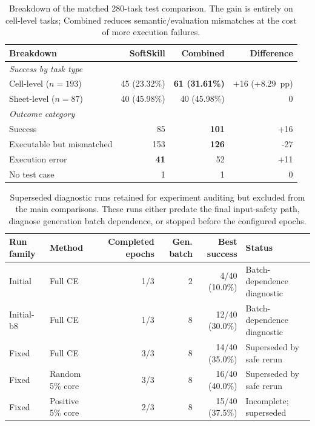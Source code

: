 \documentclass[10pt]{article}
\newcommand{\best}[1]{\textbf{#1}}
\newcommand{\pp}{~pp}
\begin{document}
\begin{table}[t]
  \centering
  \caption{Breakdown of the matched 280-task test comparison. The gain is entirely
  on cell-level tasks; Combined reduces semantic/evaluation mismatches at the cost
  of more execution failures.}
  \label{tab:test-breakdown}
  \small
  \begin{tabular}{lrrr}
    \toprule
    Breakdown & SoftSkill & Combined & Difference \\
    \midrule
    \multicolumn{4}{l}{\emph{Success by task type}} \\
    Cell-level ($n=193$) & 45 (23.32\%) & \best{61 (31.61\%)} & +16 (+8.29\pp) \\
    Sheet-level ($n=87$) & 40 (45.98\%) & 40 (45.98\%) & 0 \\
    \midrule
    \multicolumn{4}{l}{\emph{Outcome category}} \\
    Success & 85 & \best{101} & +16 \\
    Executable but mismatched & 153 & \best{126} & -27 \\
    Execution error & \best{41} & 52 & +11 \\
    No test case & 1 & 1 & 0 \\
    \bottomrule
  \end{tabular}
\end{table}

\clearpage
\begin{table}[t]
  \centering
  \caption{Superseded diagnostic runs retained for experiment auditing but excluded
  from the main comparisons. These runs either predate the final input-safety path,
  diagnose generation batch dependence, or stopped before the configured epochs.}
  \label{tab:superseded-runs}
  \small
  \begin{tabular}{llrrrl}
    \toprule
    Run family & Method & Completed epochs & Gen. batch & Best success & Status \\
    \midrule
    Initial & Full CE & 1/3 & 2 & 4/40 (10.0\%) & Batch-dependence diagnostic \\
    Initial-b8 & Full CE & 1/3 & 8 & 12/40 (30.0\%) & Batch-dependence diagnostic \\
    Fixed & Full CE & 3/3 & 8 & 14/40 (35.0\%) & Superseded by safe rerun \\
    Fixed & Random 5\% core & 3/3 & 8 & 16/40 (40.0\%) & Superseded by safe rerun \\
    Fixed & Positive 5\% core & 2/3 & 8 & 15/40 (37.5\%) & Incomplete; superseded \\
    \bottomrule
  \end{tabular}
\end{table}
\end{document}
